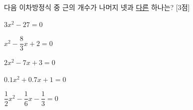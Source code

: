 다음 이차방정식 중 근의 개수가 나머지 넷과 \underline{다른} 하나는? \mbox{[3점]}
\begin{choicesii}{\rule[-3ex]{0pt}{8ex}$3x^2-27=0$}{\rule[-3ex]{0pt}{8ex}$x^2-\dfrac{8}{3}x+2=0$}{\rule[-3ex]{0pt}{8ex}$2x^2-7x+3=0$}{\rule[-3ex]{0pt}{8ex}$0.1x^2+0.7x+1=0$}{\rule[-3ex]{0pt}{8ex}$\dfrac{1}{2}x^2-\dfrac{1}{6}x-\dfrac{1}{3}=0$}\end{choicesii}
